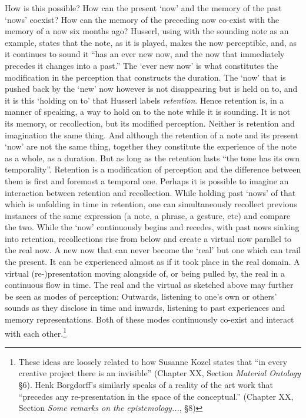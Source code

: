 How is this possible? How can the present `now' and the memory of the past `nows' coexist? How can the memory of the preceding now co-exist with the memory of a now six months ago? Husserl, using with the sounding note as an example, states that the note, as it is played, makes the now perceptible, and, as it continues to sound it ``has an ever new now, and the now that immediately precedes it changes into a past.'' \parencite[\emph{Vorlesungen zur Ph{\"a}nomenologi des inneren Zeitbewussteins}, Husserl, E. cited in][32]{ricoeur04} The `ever new now' is what constitutes the modification in the perception that constructs the duration. The `now' that is pushed back by the `new' now however is not disappearing but is held on to, and it is this `holding on to' that Husserl labels \emph{retention}. \parencite[32]{ricoeur04} Hence retention is, in a manner of speaking, a way to hold on to the note while it is sounding. It is not its memory, or recollection, but its modified perception. Neither is retention and imagination the same thing. And although the retention of a note and its present `now' are not the same thing, together they constitute the experience of the note as a whole, as a duration. But as long as the retention lasts ``the tone has its own temporality''. Retention is a modification of perception and the difference between them is first and foremost a temporal one. Perhaps it is possible to imagine an interaction between retention and  recollection. While holding past `nows' of that which is unfolding in time in retention, one can simultaneously recollect previous instances of the same expression (a note, a phrase, a gesture, etc) and compare the two. While the `now' continuously begins and recedes, with past nows sinking into retention, recollections rise from below and create a virtual now parallel to the real now. A new now that can never become the `real' but one which can trail the present. It can be experienced almost as if it took place in the real domain. A virtual (re-)presentation moving alongside of, or being pulled by, the real in a continuous flow in time. The real and the virtual as sketched above may further be seen as modes of perception: Outwards, listening to one's own or others' sounds as they disclose in time and inwards, listening to past experiences and memory representations. Both of these modes continuously co-exist and interact with each other.\footnote{These ideas are loosely related to how Susanne Kozel states that ``in every creative project there is an invisible'' (Chapter XX, Section \emph{Material Ontology} \S6). Henk Borgdorff's similarly speaks of a reality of the art work that ``precedes any re-presentation in the space of the conceptual.'' (Chapter XX, Section \emph{Some remarks on the epistemology...}, \S8)}

